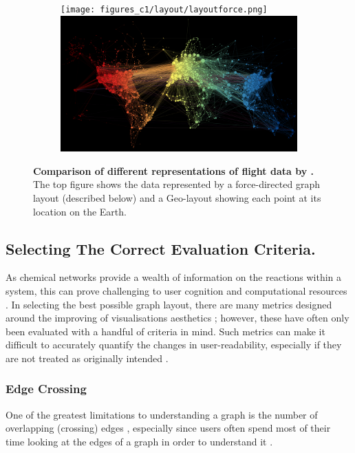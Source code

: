  
\begin{figure}[H]
     \centering 
      \begin{subfigure}[b,black]{.9\textwidth}
         \centering 
     \texttt{[image: figures\_c1/layout/layoutforce.png]}
     \includegraphics[width=\textwidth]{figures_c1/layout/layoutgeo.png}
     \end{subfigure}
        \caption{\textbf{Comparison of different representations of flight data by \citep{worldmap}.} The top figure shows the data represented by a force-directed graph layout (described below) and a Geo-layout showing each point at its location on the Earth.}
        \label{fig:worldmap}
\end{figure}


\subsection{Selecting The Correct Evaluation Criteria.}
As chemical networks provide a wealth of information on the reactions within a system, this can prove challenging to user cognition and computational resources \citep{ch1}. In selecting the best possible graph layout, there are many metrics designed around the improving of visualisations aesthetics \citep{metricgraphaesthetics}; however, these have often only been evaluated with a handful of criteria in mind. Such metrics can make it difficult to accurately quantify the changes in user-readability, especially if they are not treated as originally intended \citep{eyetrack}. 


\subsubsection{Edge Crossing} \label{sec:edgecross}
One of the greatest limitations to understanding a graph is the number of overlapping (crossing) edges \citep{humanaesthetic}, especially since users often spend most of their time looking at the edges of a graph in order to understand it \citep{eyetrack}. 

